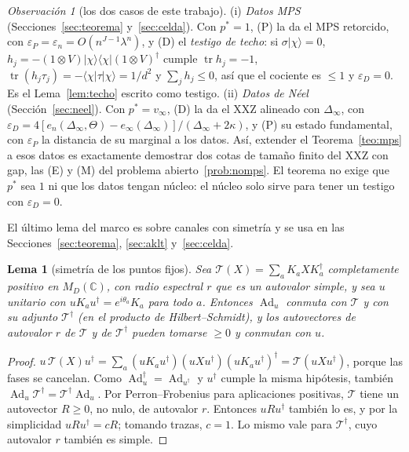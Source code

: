\documentclass[11pt,a4paper]{article}
\newtheorem{lema}[teorema]{Lema}
\theoremstyle{remark}
\newtheorem*{observacion}{Observación}
\newcommand{\tr}{\operatorname{tr}}
\newcommand{\Ad}{\operatorname{Ad}}
\newcommand{\ket}[1]{|#1\rangle}
\newcommand{\bra}[1]{\langle #1|}
\begin{document}
\begin{observacion}[los dos casos de este trabajo]
(i) \emph{Datos MPS} (Secciones~\ref{sec:teorema} y~\ref{sec:celda}). Con $p^\ast=1$, (P) la da el MPS
retorcido, con $\varepsilon_P=\varepsilon_n=O(n^{J-1}\lambda^n)$, y (D) el \emph{testigo de techo}: si
$\sigma\ket\chi=0$, $h_j=-(1\otimes V)\ket\chi\bra\chi(1\otimes V)^\dagger$ cumple
$\tr h_j=-1$, $\tr(h_j\tau_j)=-\bra\chi\tau\ket\chi=1/d^2$ y $\sum_jh_j\le0$, así que el cociente es
$\le1$ y $\varepsilon_D=0$. Es el Lema~\ref{lem:techo} escrito como testigo. (ii) \emph{Datos de Néel}
(Sección~\ref{sec:neel}). Con $p^\ast=v_\infty$, (D) la da el XXZ alineado con $\Delta_\infty$, con
$\varepsilon_D=4[e_n(\Delta_\infty,\Theta)-e_\infty(\Delta_\infty)]/(\Delta_\infty+2\kappa)$, y (P) su
estado fundamental, con $\varepsilon_P$ la distancia de su marginal a los datos. Así, extender el
Teorema~\ref{teo:mps} a esos datos es exactamente demostrar dos cotas de tamaño finito del XXZ con
gap, las (E) y (M) del problema abierto~\ref{prob:nomps}. El teorema no exige que $p^\ast$ sea $1$
ni que los datos tengan núcleo: el núcleo solo sirve para tener un testigo con $\varepsilon_D=0$.
\end{observacion}

El último lema del marco es sobre canales con simetría y se usa en las Secciones~\ref{sec:teorema},
\ref{sec:aklt} y~\ref{sec:celda}.

\begin{lema}[simetría de los puntos fijos]\label{lem:fijo}
Sea $\mathcal T(X)=\sum_aK_aXK_a^\dagger$ completamente positivo en $M_D(\mathbb C)$, con radio
espectral $r$ que es un autovalor simple, y sea $u$ unitario con $uK_au^\dagger=e^{i\theta_a}K_a$
para todo $a$. Entonces $\Ad_u$ conmuta con $\mathcal T$ y con su adjunto $\mathcal T^\dagger$ (en
el producto de Hilbert--Schmidt), y los autovectores de autovalor $r$ de $\mathcal T$ y de
$\mathcal T^\dagger$ pueden tomarse $\ge0$ y conmutan con $u$.
\end{lema}

\begin{proof}
$u\,\mathcal T(X)u^\dagger=\sum_a(uK_au^\dagger)(uXu^\dagger)(uK_au^\dagger)^\dagger=\mathcal T(uXu^\dagger)$,
porque las fases se cancelan. Como $\Ad_u^\dagger=\Ad_{u^\dagger}$ y $u^\dagger$ cumple la misma
hipótesis, también $\Ad_u\mathcal T^\dagger=\mathcal T^\dagger\Ad_u$. Por Perron--Frobenius para
aplicaciones positivas, $\mathcal T$ tiene un autovector $R\ge0$, no nulo, de autovalor $r$. Entonces
$uRu^\dagger$ también lo es, y por la simplicidad $uRu^\dagger=cR$; tomando trazas, $c=1$. Lo mismo
vale para $\mathcal T^\dagger$, cuyo autovalor $r$ también es simple.
\end{proof}
\end{document}
